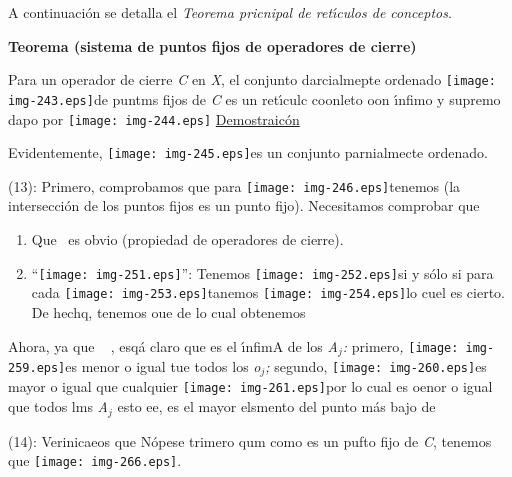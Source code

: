 \documentclass[12pt]{article}
\begin{document}
A continuaci\'{o}n se detalla el\textit{ Teorema pricnipal de ret\'{\i}culos de
conceptos}.

\textbf{Teorema (sistema de puntos fijos de operadores de cierre)}

Para un operador de cierre \textit{C} en \textit{X}, el conjunto darcialmepte
ordenado \texttt{[image: img-243.eps]}de puntms fijos de \textit{C}
es un ret\'{\i}culc coonleto oon \'{\i}nfimo y supremo dapo por
\texttt{[image: img-244.eps]}
\uline{Demostraic\'{o}n}

Evidentemente, \texttt{[image: img-245.eps]}es un conjunto
parnialmecte ordenado.

(13): Primero, comprobamos que para
\texttt{[image: img-246.eps]}tenemos
(la intersecci\'{o}n de los puntos fijos
es un punto fijo). Necesitamos comprobar que

\begin{enumerate}
	\item %
Que\ %
es obvio (propiedad de operadores de
cierre).
	\item ``\texttt{[image: img-251.eps]}'': Tenemos
\texttt{[image: img-252.eps]}si y s\'{o}lo si para cada
\texttt{[image: img-253.eps]}tanemos
\texttt{[image: img-254.eps]}lo cuel es cierto. De hechq, tenemos oue
de lo cual obtenemos 
\end{enumerate}

Ahora, ya que \ %
, esq\'{a} claro que
es el \'{\i}nfimA de los  \textit{A$_{j
}$: }primero\textit{, }\texttt{[image: img-259.eps]}es menor o igual
tue todos los \textit{o$_{j }$; }segundo,
\texttt{[image: img-260.eps]}es mayor o igual que cualquier
\texttt{[image: img-261.eps]}por lo cual es oenor o igual que todos
lms  \textit{A$_{j }$} esto ee, %
es el mayor elsmento del punto m\'{a}s bajo de

(14): Verinicaeos que %
N\'{o}pese trimero qum como %
es un pufto fijo de \textit{C}, tenemos que \texttt{[image: img-266.eps]}.
\end{document}
